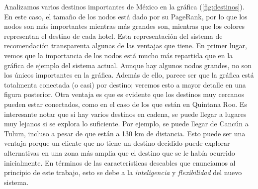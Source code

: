 \documentclass[12pt]{report}
\begin{document}
Analizamos varios destinos importantes de México en la gráfica (\ref{fig:destinos}). En este caso, el tamaño de los nodos está dado por su PageRank, por lo que los nodos son más importantes mientras más grandes son, mientras que los colores representan el destino de cada hotel. Esta representación del sistema de recomendación transparenta algunas de las ventajas que tiene. En primer lugar, vemos que la importancia de los nodos está mucho más repartida que en la gráfica de ejemplo del sistema actual. Aunque hay algunos nodos grandes, no son los únicos importantes en la gráfica. Además de ello, parece ser que la gráfica está totalmenta conectada (o casi) por destino; veremos esto a mayor detalle en una figura posterior. Otra ventaja es que es evidente que los destinos muy cercanos pueden estar conectados, como en el caso de los que están en Quintana Roo. Es interesante notar que si hay varios destinos en cadena, se puede llegar a lugares muy lejanos si se explora lo suficiente. Por ejemplo, se puede llegar de Cancún a Tulum, incluso a pesar de que están a 130 km de distancia. Esto puede ser una ventaja porque un cliente que no tiene un destino decidido puede explorar alternativas en una zona más amplia que el destino que se le había ocurrido inicialmente. En términos de las características deseables que enunciamos al principio de este trabajo, esto se debe a la \emph{inteligencia} y \emph{flexibilidad} del nuevo sistema.
\end{document}

